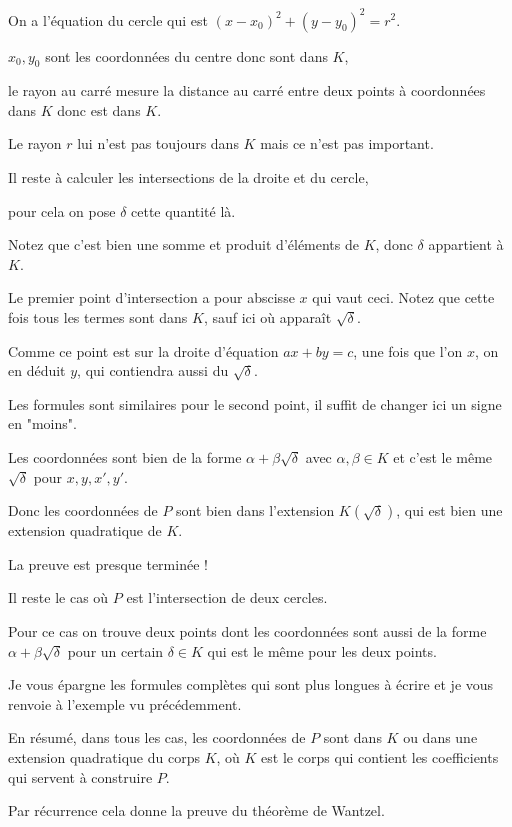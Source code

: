 \change
On a l'équation du cercle qui est $(x-x_0)^2+(y-y_0)^2=r^2$. 

$x_0,y_0$ sont les coordonnées du centre donc sont dans $K$,

le rayon au carré mesure la distance au carré entre deux points à coordonnées dans $K$ donc est dans $K$.

Le rayon $r$ lui n'est pas toujours dans $K$ mais ce n'est pas important.

\change
Il reste à calculer les intersections de la droite et du cercle,

\change
pour cela on pose $\delta$ cette quantité là.

Notez que c'est bien une somme et produit d'éléments de $K$, donc 
$\delta$ appartient à $K$.

\change

Le premier point d'intersection a pour abscisse $x$ qui vaut ceci.
Notez que cette fois tous les termes sont dans $K$, sauf ici où apparaît $\sqrt{\delta}$.

Comme ce point est sur la droite d'équation $ax+by=c$, une fois que l'on $x$, on en déduit $y$, qui contiendra aussi
du $\sqrt{\delta}$.

\change
Les formules sont similaires pour le second point, il suffit de changer ici un signe en "moins".

\change
Les coordonnées sont bien de la forme $\alpha+\beta\sqrt{\delta}$ avec $\alpha,\beta \in K$
et c'est le même $\sqrt{\delta}$ pour $x,y,x',y'$.

\change
Donc les coordonnées de $P$ sont bien dans l'extension $K(\sqrt \delta)$, 
qui est bien une extension quadratique de $K$.


\diapo

La preuve est presque terminée !

Il reste le cas où $P$ est l'intersection de deux cercles.

\change
Pour ce cas on trouve deux points dont les coordonnées sont 
aussi de la forme $\alpha+\beta\sqrt\delta$
pour un certain $\delta \in K$ qui est le même pour les deux points.

Je vous épargne les formules complètes qui sont plus longues à écrire
et je vous renvoie à l'exemple vu précédemment.

\change
En résumé, dans tous les cas, les coordonnées de $P$ sont dans $K$ ou dans 
une extension quadratique du corps $K$, 
où $K$ est le corps qui contient les coefficients qui servent à construire $P$.


Par récurrence cela donne la preuve du théorème de Wantzel.


